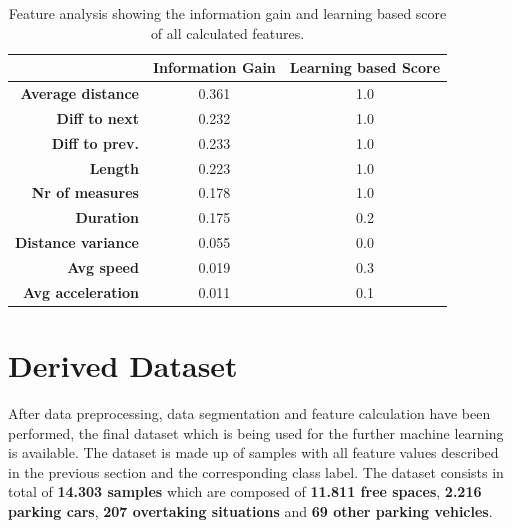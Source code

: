 \begin{table}


\bgroup
\def\arraystretch{1.4}
\begin{tabular}{| r || c | c |}
\hline
   & 
   \textbf{Information Gain} & 
   \textbf{Learning based Score} \\
\hline
  \textbf{Average distance} & 
   0.361 &
   1.0 \\
\hline
\textbf{Diff to next} & 
   0.232 &
   1.0 \\
\hline
\textbf{Diff to prev.} & 
   0.233 &
   1.0 \\
\hline
\textbf{Length} & 
   0.223 &
   1.0 \\
\hline
\textbf{Nr of measures} & 
   0.178 &
   1.0 \\
\hline
\textbf{Duration} & 
   0.175 &
   0.2 \\
\hline
\textbf{Distance variance} & 
   0.055 &
   0.0 \\
\hline
\textbf{Avg speed} & 
   0.019 &
   0.3 \\
\hline
\textbf{Avg acceleration} & 
   0.011 &
   0.1 \\
\hline


\end{tabular}
\egroup

\caption{Feature analysis showing the information gain and learning based score of all calculated features.}
\label{table:feature_analysis}
\end{table}















\section{Derived Dataset}
\label{sec:derived_dataset}

After data preprocessing, data segmentation and feature calculation have been performed, the final dataset which is being used for the further machine learning is available. The dataset is made up of samples with all feature values described in the previous section and the corresponding class label. The dataset consists in total of \textbf{14.303 samples} which are composed of \textbf{11.811 free spaces}, \textbf{2.216 parking cars}, \textbf{207 overtaking situations} and \textbf{69 other parking vehicles}. 








